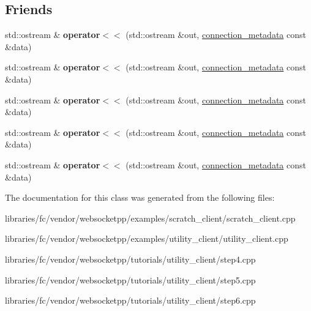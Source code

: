 \subsection*{Friends}
\begin{DoxyCompactItemize}
\item 
\mbox{\label{classconnection__metadata_a24cddaec7a0830c80ab7b08de97d5976}} 
std\+::ostream \& {\bfseries operator$<$$<$} (std\+::ostream \&out, \mbox{\hyperlink{classconnection__metadata}{connection\+\_\+metadata}} const \&data)
\item 
\mbox{\label{classconnection__metadata_a24cddaec7a0830c80ab7b08de97d5976}} 
std\+::ostream \& {\bfseries operator$<$$<$} (std\+::ostream \&out, \mbox{\hyperlink{classconnection__metadata}{connection\+\_\+metadata}} const \&data)
\item 
\mbox{\label{classconnection__metadata_a24cddaec7a0830c80ab7b08de97d5976}} 
std\+::ostream \& {\bfseries operator$<$$<$} (std\+::ostream \&out, \mbox{\hyperlink{classconnection__metadata}{connection\+\_\+metadata}} const \&data)
\item 
\mbox{\label{classconnection__metadata_a24cddaec7a0830c80ab7b08de97d5976}} 
std\+::ostream \& {\bfseries operator$<$$<$} (std\+::ostream \&out, \mbox{\hyperlink{classconnection__metadata}{connection\+\_\+metadata}} const \&data)
\item 
\mbox{\label{classconnection__metadata_a24cddaec7a0830c80ab7b08de97d5976}} 
std\+::ostream \& {\bfseries operator$<$$<$} (std\+::ostream \&out, \mbox{\hyperlink{classconnection__metadata}{connection\+\_\+metadata}} const \&data)
\end{DoxyCompactItemize}


The documentation for this class was generated from the following files\+:\begin{DoxyCompactItemize}
\item 
libraries/fc/vendor/websocketpp/examples/scratch\+\_\+client/scratch\+\_\+client.\+cpp\item 
libraries/fc/vendor/websocketpp/examples/utility\+\_\+client/utility\+\_\+client.\+cpp\item 
libraries/fc/vendor/websocketpp/tutorials/utility\+\_\+client/step4.\+cpp\item 
libraries/fc/vendor/websocketpp/tutorials/utility\+\_\+client/step5.\+cpp\item 
libraries/fc/vendor/websocketpp/tutorials/utility\+\_\+client/step6.\+cpp\end{DoxyCompactItemize}
